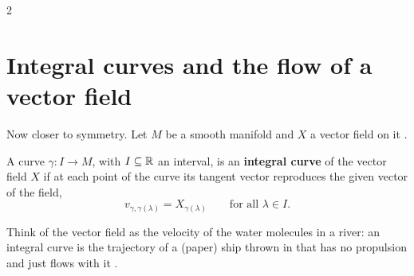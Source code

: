 \begin{paracol}{2}
\section{Integral curves and the flow of a vector field}\label{sec:c11-flow}

Now closer to symmetry. Let $M$ be a smooth manifold and $X$ a vector field on it .

\begin{definition}\label{def:c11-integral}
A curve $\gamma\colon I\to M$, with $I\subseteq\mathbb{R}$ an interval, is an \textbf{integral curve} of the vector field $X$ if at each point of the curve its tangent vector reproduces the given vector of the field,
\[
  v_{\gamma,\gamma(\lambda)}=X_{\gamma(\lambda)}\qquad\text{for all }\lambda\in I.
\]
\end{definition}
Think of the vector field as the velocity of the water molecules in a river: an integral curve is the trajectory of a (paper) ship thrown in that has no propulsion and just flows with it .


\end{paracol}
